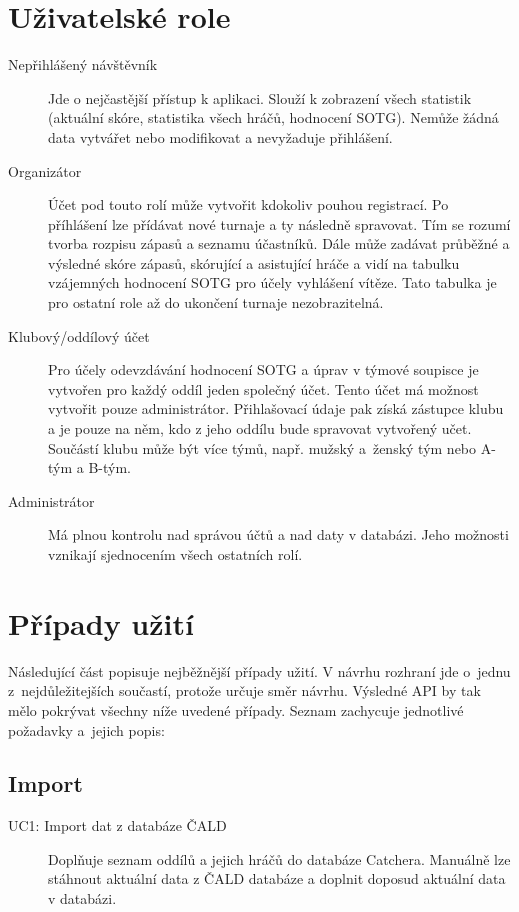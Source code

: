 \section{Uživatelské role}

\begin{description}
  \item[Nepřihlášený návštěvník]
    Jde o nejčastější přístup k aplikaci. Slouží k zobrazení všech statistik (aktuální skóre,
    statistika všech hráčů, hodnocení SOTG). Nemůže žádná data vytvářet nebo modifikovat
    a nevyžaduje přihlášení.
  \item[Organizátor]
    Účet pod touto rolí může vytvořit kdokoliv pouhou registrací. Po příhlášení lze přídávat
    nové turnaje a ty následně spravovat. Tím se rozumí tvorba rozpisu zápasů a seznamu účastníků.
    Dále může zadávat průběžné a výsledné skóre zápasů, skórující a asistující hráče a vidí
    na tabulku vzájemných hodnocení SOTG pro účely vyhlášení vítěze.
    Tato tabulka je pro ostatní role až do ukončení turnaje nezobrazitelná.
  \item[Klubový/oddílový účet]
    Pro účely odevzdávání hodnocení SOTG a úprav v týmové soupisce je vytvořen pro každý oddíl
    jeden společný účet. Tento účet má možnost vytvořit pouze administrátor. Přihlašovací údaje pak
    získá zástupce klubu a je pouze na něm, kdo z jeho oddílu bude spravovat vytvořený učet.
    Součástí klubu může být více týmů, např. mužský a~ženský tým nebo A-tým a B-tým.
  \item[Administrátor]
    Má plnou kontrolu nad správou účtů a nad daty v databázi.
    Jeho možnosti vznikají sjednocením všech ostatních rolí.
\end{description}

\section{Případy užití}
\label{sec:use_case}

Následující část popisuje nejběžnější případy užití. V návrhu rozhraní jde
o~jednu z~nejdůležitejších součastí, protože určuje směr návrhu. Výsledné API by tak mělo
pokrývat všechny níže uvedené případy. Seznam zachycuje jednotlivé požadavky
a~jejich popis:

\subsection*{Import}
  \begin{description}
    \item[UC1: Import dat z databáze ČALD]
      Doplňuje seznam oddílů a jejich hráčů do databáze Catchera. Manuálně lze stáhnout
      aktuální data z ČALD databáze a doplnit doposud aktuální data v databázi.
  \end{description}

